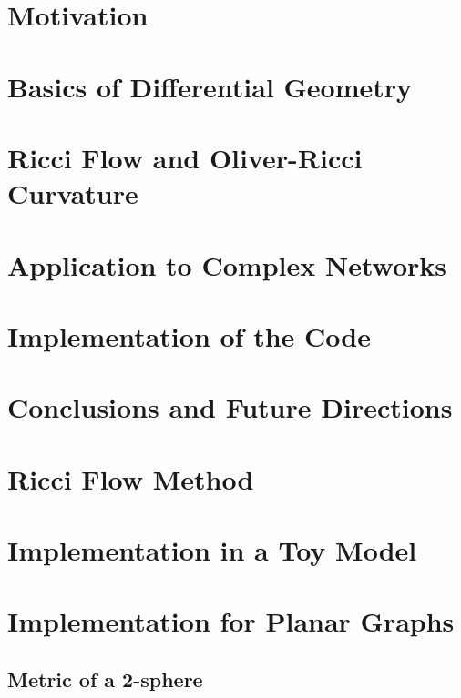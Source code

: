 \documentclass[a4paper,12pt,twoside,online,customfont,custombib,PageStyleI,draftclassic]{Settings/PhDThesisPSnPDF}
\begin{document}
\chapter{Motivation}


\chapter{Basics of Differential Geometry}


\chapter{Ricci Flow and Oliver-Ricci Curvature}

\chapter{Application to Complex Networks}

\chapter{Implementation of the Code}

\chapter{Conclusions and Future Directions}



\chapter{Ricci Flow Method}


\chapter{Implementation in a Toy Model}


\chapter{Implementation for Planar Graphs}


\begin{appendices} %
\chapter{Metric of a 2-sphere}

\end{appendices}
\end{document}
